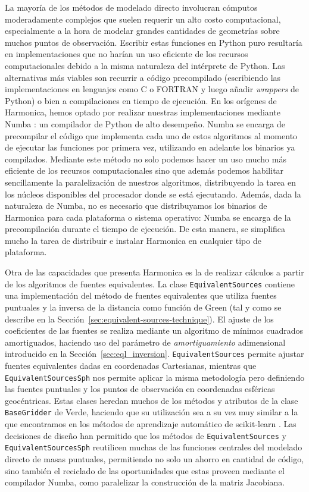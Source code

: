 La mayoría de los métodos de modelado directo involucran cómputos moderadamente
complejos que suelen requerir un alto costo computacional, especialmente a la
hora de modelar grandes cantidades de geometrías sobre muchos puntos de
observación.
Escribir estas funciones en Python puro resultaría en implementaciones que no
harían un uso eficiente de los recursos computacionales debido a la misma
naturaleza del intérprete de Python.
Las alternativas más viables son recurrir a código precompilado (escribiendo
las implementaciones en lenguajes como C o FORTRAN y luego añadir
\emph{wrappers} de Python) o bien a compilaciones en tiempo de ejecución.
En los orígenes de Harmonica, hemos optado por realizar nuestras
implementaciones mediante Numba \citep{numba2015}: un compilador de Python de
alto desempeño.
Numba se encarga de precompilar el código que implementa cada uno de estos
algoritmos al momento de ejecutar las funciones por primera vez, utilizando en
adelante los binarios ya compilados.
Mediante este método no solo podemos hacer un uso mucho más eficiente de los
recursos computacionales sino que además podemos habilitar sencillamente la
paralelización de nuestros algoritmos, distribuyendo la tarea en los
núcleos disponibles del procesador donde se está ejecutando.
Además, dada la naturaleza de Numba, no es necesario que distribuyamos los
binarios de Harmonica para cada plataforma o sistema operativo: Numba se
encarga de la precompilación durante el tiempo de ejecución.
De esta manera, se simplifica mucho la tarea de distribuir e instalar
Harmonica en cualquier tipo de plataforma.

Otra de las capacidades que presenta Harmonica es la de realizar cálculos
a partir de los algoritmos de fuentes equivalentes.
La clase \texttt{EquivalentSources} contiene una implementación del método de
fuentes equivalentes que utiliza fuentes puntuales y la inversa de la distancia
como función de Green (tal y como se describe en la
Sección~\ref{sec:equivalent-sources-technique}).
El ajuste de los coeficientes de las fuentes se realiza mediante un algoritmo
de mínimos cuadrados amortiguados, haciendo uso del parámetro de
\emph{amortiguamiento} adimensional introducido en la
Sección~\ref{sec:eql_inversion}.
\texttt{EquivalentSources} permite ajustar fuentes equivalentes dadas en
coordenadas Cartesianas, mientras que \texttt{EquivalentSourcesSph} nos permite
aplicar la misma metodología pero definiendo las fuentes puntuales y los puntos
de observación en coordenadas esféricas geocéntricas.
Estas clases heredan muchos de los métodos y atributos de la clase
\texttt{BaseGridder} de Verde, haciendo que su utilización sea a su vez
muy similar a la que encontramos en los métodos de aprendizaje automático de
scikit-learn \citep{sklearn2011}.
Las decisiones de diseño han permitido que los métodos de
\texttt{EquivalentSources} y \texttt{EquivalentSourcesSph} reutilicen muchas de
las funciones centrales del modelado directo de masas puntuales, permitiendo no
solo un ahorro en cantidad de código, sino también el reciclado de las
oportunidades que estas proveen mediante el compilador Numba, como paralelizar
la construcción de la matriz Jacobiana.

